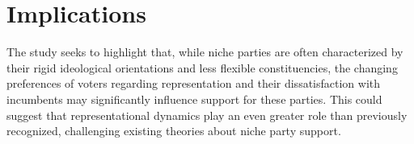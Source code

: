 
\section{Implications}\label{sec:Implications} %
The study seeks to highlight that, while niche parties are often characterized by their rigid ideological orientations and less flexible constituencies, the changing preferences of voters regarding representation and their dissatisfaction with incumbents may significantly influence support for these parties. This could suggest that representational dynamics play an even greater role than previously recognized, challenging existing theories about niche party support.


\printbibliography

